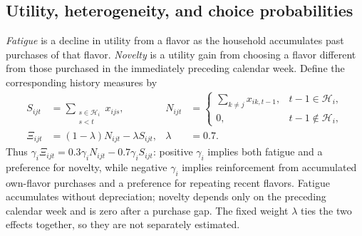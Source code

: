 \documentclass[11pt]{article}
\begin{document}
\subsection{Utility, heterogeneity, and choice probabilities}
\emph{Fatigue} is a decline in utility from a flavor as the household accumulates
past purchases of that flavor. \emph{Novelty} is a utility gain from choosing a
flavor different from those purchased in the immediately preceding calendar
week. Define the corresponding history measures by
\begin{equation}
\begin{aligned}
S_{ijt}&=\sum_{\substack{s\in\mathcal H_i\\s<t}}x_{ijs},
&N_{ijt}&=\begin{cases}
\sum_{k\ne j}x_{ik,t-1},&t-1\in\mathcal H_i,\\
0,&t-1\notin\mathcal H_i,
\end{cases}\\
\Xi_{ijt}&=(1-\lambda)N_{ijt}-\lambda S_{ijt},
&\lambda&=0.7.
\end{aligned}
\end{equation}
Thus $\gamma_i\Xi_{ijt}=0.3\gamma_iN_{ijt}-0.7\gamma_iS_{ijt}$:
positive $\gamma_i$ implies both fatigue and a preference for novelty, while
negative $\gamma_i$ implies reinforcement from accumulated own-flavor purchases
and a preference for repeating recent flavors. Fatigue accumulates without
depreciation; novelty depends only on the preceding calendar week and is zero
after a purchase gap. The fixed weight $\lambda$ ties the two effects together,
so they are not separately estimated.
\end{document}
